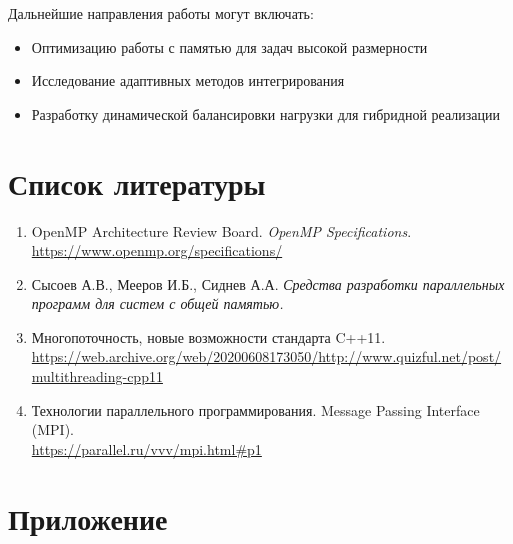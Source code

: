 \documentclass[14pt,a4paper]{extarticle}
\begin{document}
Дальнейшие направления работы могут включать:
\begin{itemize}
    \item Оптимизацию работы с памятью для задач высокой размерности
    \item Исследование адаптивных методов интегрирования
    \item Разработку динамической балансировки нагрузки для гибридной реализации
\end{itemize}
\newpage

\section{Список литературы}

\begin{enumerate}
    \item OpenMP Architecture Review Board. \textit{OpenMP Specifications}. \url{https://www.openmp.org/specifications/}
    
    \item Сысоев А.В., Мееров И.Б., Сиднев А.А. \textit{Средства разработки параллельных программ для систем с общей памятью.}
    
    \item Многопоточность, новые возможности стандарта C++11. \\ 
    \url{https://web.archive.org/web/20200608173050/http://www.quizful.net/post/multithreading-cpp11}
    
    \item Технологии параллельного программирования. Message Passing Interface (MPI). \\ 
    \url{https://parallel.ru/vvv/mpi.html#p1}
\end{enumerate}
\newpage

\section{Приложение}
\end{document}
